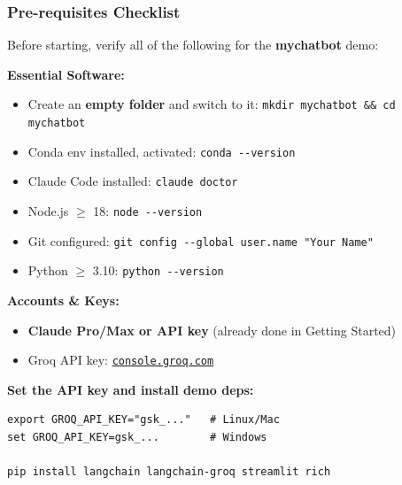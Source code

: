 \begin{frame}[fragile]\frametitle{Pre-requisites Checklist}
Before starting, verify all of the following for the \textbf{mychatbot} demo:

\textbf{Essential Software:}
  \begin{itemize}
    \item Create an \textbf{empty folder} and switch to it: \lstinline|mkdir mychatbot && cd mychatbot|
    \item Conda env installed, activated: \lstinline|conda --version|
    \item Claude Code installed: \lstinline|claude doctor|
    \item Node.js $\geq$ 18: \lstinline|node --version|
    \item Git configured: \lstinline|git config --global user.name "Your Name"|
    \item Python $\geq$ 3.10: \lstinline|python --version|
  \end{itemize}

\textbf{Accounts \& Keys:}
  \begin{itemize}
    \item \textbf{Claude Pro/Max or API key} (already done in Getting Started)
    \item Groq API key: \href{https://console.groq.com}{\texttt{console.groq.com}}
  \end{itemize}

\textbf{Set the API key and install demo deps:}
\begin{lstlisting}
export GROQ_API_KEY="gsk_..."   # Linux/Mac
set GROQ_API_KEY=gsk_...        # Windows

pip install langchain langchain-groq streamlit rich
\end{lstlisting}
\end{frame}


